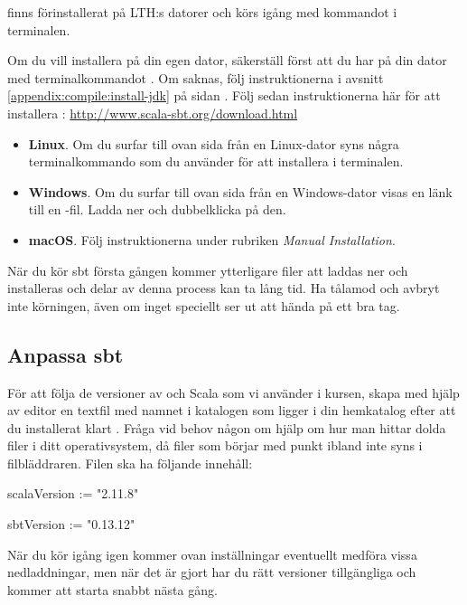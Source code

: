 \sbt finns förinstallerat på LTH:s datorer och körs igång med kommandot \sbt i terminalen.

Om du vill installera \sbt på din egen dator,
säkerställ först att du har  på din dator med terminalkommandot . Om  saknas, följ instruktionerna i avsnitt \ref{appendix:compile:install-jdk} på sidan \pageref{appendix:compile:install-jdk}. 
Följ sedan instruktionerna här för att installera \sbt: \url{http://www.scala-sbt.org/download.html} 

\begin{itemize}

\item \textbf{Linux}. Om du surfar till ovan sida från en Linux-dator syns några terminalkommando som du använder för att installera \sbt i terminalen. 

\item \textbf{Windows}. Om du surfar till ovan sida från en Windows-dator visas en länk till en -fil. Ladda ner och dubbelklicka på den.

\item \textbf{macOS}. Följ instruktionerna under rubriken \textit{Manual Installation}.

\end{itemize}

\noindent När du kör sbt första gången kommer ytterligare filer att laddas ner och installeras och delar av denna process kan ta lång tid. Ha tålamod och avbryt inte körningen, även om inget speciellt ser ut att hända på ett bra tag.

\subsection{Anpassa sbt}
För att följa de versioner av \sbt och Scala som vi använder i kursen, skapa med hjälp av editor en textfil med namnet  i katalogen  som ligger i din hemkatalog efter att du installerat klart \sbt. Fråga vid behov någon om hjälp om hur man hittar dolda filer i ditt operativsystem, då filer som börjar med punkt ibland inte syns i filbläddraren. Filen ska ha följande innehåll:
\begin{Code}
scalaVersion := "2.11.8"

sbtVersion := "0.13.12"
\end{Code} 

\noindent När du kör igång \sbt igen kommer ovan inställningar eventuellt medföra vissa nedladdningar, men när det är gjort har du rätt versioner tillgängliga och \sbt kommer att starta snabbt nästa gång.


